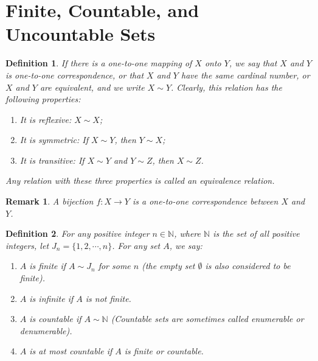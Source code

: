 \documentclass[10pt]{book}
\newtheorem{definition}{Definition}[chapter]
\newtheorem{remark}{Remark}[chapter]
\theoremstyle{definition}
\numberwithin{equation}{chapter}
\begin{document}
\medskip

\section{Finite, Countable, and Uncountable Sets}

\begin{definition}
If there is a one-to-one mapping of $X$ onto $Y$, we say that $X$ and $Y$ is one-to-one correspondence, or that $X$ and $Y$ have the same cardinal number, or $X$ and $Y$ are equivalent, and we write $X \sim Y$. Clearly, this relation has the following properties:
\begin{enumerate}[label=(\alph*)]
    \item It is reflexive: $X \sim X$;
    
    \item It is symmetric: If $X \sim Y$, then $Y \sim X$;
    
    \item It is transitive: If $X \sim Y$ and $Y \sim Z$, then $X \sim Z$.
\end{enumerate}
Any relation with these three properties is called an equivalence relation.
\end{definition}

\medskip

\begin{remark}
A bijection $f:X \to Y$ is a one-to-one correspondence between $X$ and $Y$.
\end{remark}

\medskip

\begin{definition}
For any positive integer $n \in \mathbb{N}$, where $\mathbb{N}$ is the set of all positive integers, let $J_n = \{1,2,\cdots,n\}$. For any set $A$, we say:
\begin{enumerate}[label=(\alph*)]
    \item $A$ is finite if $A \sim J_n$ for some $n$ (the empty set $\emptyset$ is also considered to be finite).
    
    \item $A$ is infinite if $A$ is not finite.
    
    \item $A$ is countable if $A \sim \mathbb{N}$ (Countable sets are sometimes called enumerable or denumerable).
    
    \item $A$ is at most countable if $A$ is finite or countable.
\end{enumerate}
\end{definition}
\end{document}
